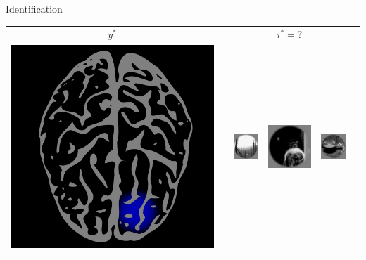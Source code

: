 \documentclass[final]{beamer}
\newlength{\onecolwid}
\begin{document}
\begin{frame}[t]
\begin{columns}[t]
\begin{column}{\onecolwid}
\begin{block}{Identification}
\begin{center}
\begin{tabular}{c|c|cccc}
\hline
$y^*$ &     & &  $i^* = ?$  &   \\
\includegraphics[scale = 0.06]{brain7.png} & \hspace{0.5in} 
& \includegraphics[scale = .5]{img5.png}
& \includegraphics[scale = .5]{img6.png}
& \includegraphics[scale = .5]{img7.png}

\end{tabular}
\end{center}
\end{block}
\end{column}
\end{columns}
\end{frame}
\end{document}
